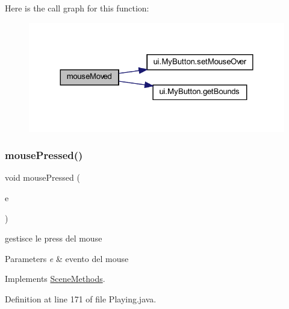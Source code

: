 Here is the call graph for this function\+:\nopagebreak
\begin{figure}[H]
\begin{center}
\leavevmode
\includegraphics[width=324pt]{classscenes_1_1_playing_a2ca251710b65639ec80bc141edde60aa_cgraph}
\end{center}
\end{figure}
\mbox{\label{classscenes_1_1_playing_aed82e1ce3dd3cf283d508c3ba3be70ef}} 
\subsubsection{\texorpdfstring{mouse\+Pressed()}{mousePressed()}}
{\footnotesize\ttfamily void mouse\+Pressed (\begin{DoxyParamCaption}\item[{Mouse\+Event}]{e }\end{DoxyParamCaption})}



gestisce le press del mouse 


\begin{DoxyParams}{Parameters}
{\em e} & evento del mouse \\
\hline
\end{DoxyParams}


Implements \hyperlink{interfacescenes_1_1_scene_methods_aed82e1ce3dd3cf283d508c3ba3be70ef}{Scene\+Methods}.



Definition at line 171 of file Playing.\+java.


